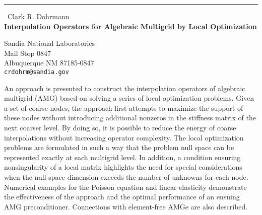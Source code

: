 \documentclass{report}
\begin{document}
\begin{center}
\rule{6in}{1pt} \
{\large Clark R. Dohrmann \\
{\bf Interpolation Operators for Algebraic Multigrid by Local Optimization}}

Sandia National Laboratories \\ Mail Stop 0847 \\ Albuquerque NM 87185-0847
\\
{\tt crdohrm@sandia.gov}\end{center}

An approach is presented to construct the interpolation operators of
algebraic multigrid (AMG) based on solving a series of local optimization
problems. Given a set of coarse nodes, the approach first attempts to
maximize the support of these nodes without introducing additional
nonzeros in the stiffness matrix of the next coarser level. By doing so,
it is possible to reduce the energy of coarse interpolations without
increasing operator complexity. The local optimization problems are
formulated in such a way that the problem null space can be represented
exactly at each multigrid level. In addition, a condition ensuring
nonsingularity of a local matrix highlights the need for special
considerations when the null space dimension exceeds the number of
unknowns for each node. Numerical examples for the Poisson equation and
linear elasticity demonstrate the effectiveness of the approach and the
optimal performance of an ensuing AMG preconditioner. Connections with
element-free AMGe are also described.
\end{document}
